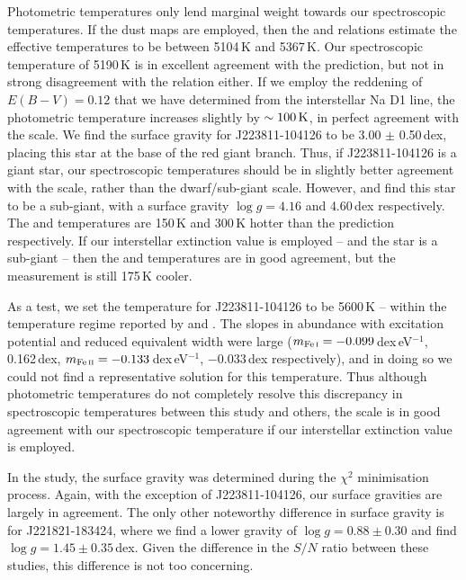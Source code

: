 \documentclass{emulateapj}
\begin{document}
Photometric temperatures only lend marginal weight towards our spectroscopic temperatures. If the \citet{schlegel;et-al_1998} dust maps are employed, then the \citet{alonso;et-al_1999} and \citet{casagrande;et-al_2010} relations estimate the effective temperatures to be between {5104\,K} and {5367\,K}. Our spectroscopic temperature of {5190\,K} is in excellent agreement with the \citet{alonso;et-al_1999} prediction, but not in strong disagreement with the \citet{casagrande;et-al_2010} relation either. If we employ the reddening of $E(B-V) = 0.12$ that we have determined from the interstellar Na D1 line, the photometric temperature increases slightly by {$\sim{}100\,{\rm K}$}, in perfect agreement with the \citet{alonso;et-al_1999} scale. We find the surface gravity for {J223811-104126} to be {3.00 $\pm$ 0.50\,dex}, placing this star at the base of the red giant branch. Thus, if {J223811-104126} is a giant star, our spectroscopic temperatures should be in slightly better agreement with the \citet{alonso;et-al_1999} scale, rather than the \citet{casagrande;et-al_2010} dwarf/sub-giant scale. However, \citet{williams;et-al_2011} and \citet{wylie-de-boer;et-al_2012} find this star to be a sub-giant, with a surface gravity {$\log{g} = 4.16$} and {4.60\,dex} respectively. The \citet{williams;et-al_2011} and \citet{wylie-de-boer;et-al_2012} temperatures are 150\,K and 300\,K hotter than the \citet{casagrande;et-al_2010} prediction respectively. If our interstellar extinction value is employed -- and the star is a sub-giant -- then the \citet{williams;et-al_2011} and \citet{casagrande;et-al_2010} temperatures are in good agreement, but the \citet{wylie-de-boer;et-al_2012} measurement is still 175\,K cooler.

As a test, we set the temperature for {J223811-104126} to be 5600\,K -- within the temperature regime reported by \citet{williams;et-al_2011} and \citet{wylie-de-boer;et-al_2012}. The slopes in abundance with excitation potential and reduced equivalent width were large (${m_{\rm Fe\,\textsc{i}} = -0.099}$\,dex\,eV$^{-1}$, 0.162\,dex, ${m_{\rm Fe\,\textsc{ii}} = -0.133}$\,dex\,eV$^{-1}$, $-0.033$\,dex respectively), and in doing so we could not find a representative solution for this temperature. Thus although photometric temperatures do not completely resolve this discrepancy in spectroscopic temperatures between this study and others, the \citet{alonso;et-al_1999} scale is in good agreement with our spectroscopic temperature if our interstellar extinction value is employed.

In the \citet{wylie-de-boer;et-al_2012} study, the surface gravity was determined during the $\chi^2$ minimisation process. Again, with the exception of {J223811-104126}, our surface gravities are largely in agreement. The only other noteworthy difference in surface gravity is for {J221821-183424}, where we find a lower gravity of {$\log{g} = 0.88 \pm 0.30$} and \citet{wylie-de-boer;et-al_2012} find {$\log{g} = 1.45 \pm 0.35$\,dex}. Given the difference in the $S/N$ ratio between these studies, this difference is not too concerning. 
\end{document}
